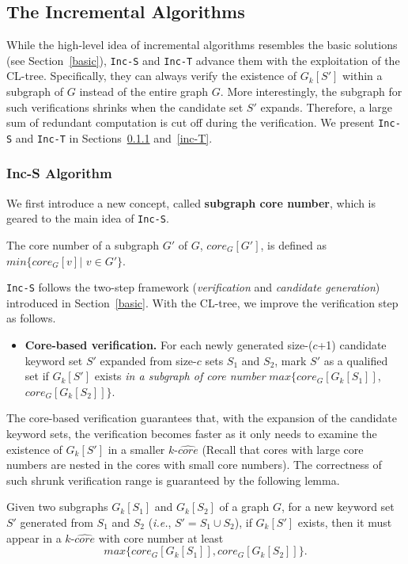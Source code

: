\subsection{The Incremental Algorithms}
\label{inc}

While the high-level idea of incremental algorithms resembles the basic solutions (see Section~\ref{basic}),
{\tt Inc-S} and {\tt Inc-T} advance them with the exploitation of the CL-tree.
Specifically, they can always verify the existence of $G_k[S']$ within a subgraph of $G$ instead of the entire graph $G$. More interestingly, the subgraph for such verifications shrinks when the candidate set $S'$ expands. Therefore, a large sum of redundant computation is cut off during the verification. We present {\tt Inc-S} and {\tt Inc-T} in Sections~\ref{inc-S} and~\ref{inc-T}.


\subsubsection{Inc-S Algorithm}
\label{inc-S}
We first introduce a new concept, called \textbf{subgraph core number},
which is geared to the main idea of {\tt Inc-S}.

\begin{definition}
\label{def:ccscore}
  The core number of a subgraph $G'$ of $G$, $core_G[G']$,
  is defined as $min\{core_G[v]|$ $v\in G'\}$.
\end{definition}


{\tt Inc-S} follows the two-step framework (\emph{verification} and \emph{candidate generation})
introduced in Section~\ref{basic}. With the CL-tree, we improve the verification step as follows.
\begin{itemize}
\item {\bf Core-based verification.} For each newly generated size-($c$+1) candidate keyword set $S'$ expanded from size-$c$ sets $S_1$ and $S_2$, mark $S'$ as a qualified set if $G_k[S']$ exists \textit{in a subgraph of core number} $max\{core_G[G_k[S_1]]$, $core_G[G_k[S_2]]\}$.
\end{itemize}

The core-based verification guarantees that, with the expansion of the candidate keyword sets, the verification becomes faster as it only needs to examine the existence of $G_k[S']$ in a smaller $k$-$\widehat {core}$ (Recall that cores with large core numbers are nested in the cores with small core numbers). The correctness of such shrunk verification range is guaranteed by the following lemma.
\begin{lemma}
\label{lemma:coreDown}
  Given two subgraphs $G_k[S_1]$ and $G_k[S_2]$ of a graph $G$,
  for a new keyword set $S'$ generated from $S_1$ and $S_2$ (\textit{i.e.}, $S'=S_1\cup S_2$),
  if $G_k[S']$ exists, then it must appear in a $k$-$\widehat {core}$ with core number at least
  \begin{equation}
    max\{core_G[G_k[S_1]], core_G[G_k[S_2]]\}.
  \end{equation}
\end{lemma}

